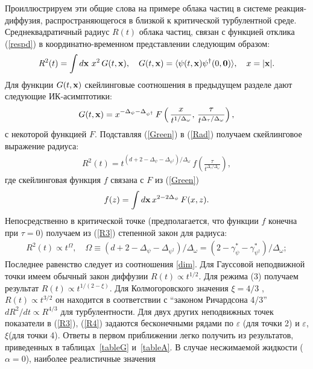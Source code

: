 \documentclass[a4paper,10pt]{article}
\begin{document}
Проиллюстрируем эти общие слова на примере облака частиц в системе реакция-диффузия, распространяющегося в близкой к критической турбулентной среде.
Среднеквадратичный радиус $R(t)$ облака частиц, связан с  функцией отклика (\ref{respd}) в координатно-временном представлении следующим образом:
\begin{eqnarray}
R^{2}(t) = \int d{\bf x}\ x^{2}\, G(t,{\bf x}), \quad
G(t,{\bf x}) = \langle \psi (t,{\bf x}) \psi^{\dag} (0,{\bf 0}) \rangle,
\quad x=|{\bf x}|.
\label{Rad}
\end{eqnarray}
Для  функции $G(t,{\bf x})$ скейлинговые соотношения в предыдущем разделе дают следующие ИК-асимптотики:
\begin{eqnarray}
G(t,{\bf x}) = x^{-\Delta_{\psi}-\Delta_{\psi^{\dag}}} \, F
\left(\, \frac{x} { t^ {1/\Delta_{\omega}} }, \,
\frac{\tau}{t^{\Delta_{\tau}/\Delta_{\omega}}}  \right),
\label{Green}
\end{eqnarray}
с некоторой функцией $F$.
Подставляя (\ref{Green}) в (\ref{Rad}) получаем скейлинговое выражение радиуса:
\begin{eqnarray}
R^2(t) = t^{ (d+2 -\Delta_{\psi}-\Delta_{\psi^{\dag}})/\Delta_{\omega} }
\, f \left( \frac{\tau}{t^{\Delta_{\tau}/\Delta_{\omega}}}  \right),
\label{R3}
\end{eqnarray}
где скейлинговая функция $f$  связана с $ F $ из (\ref{Green})
\[ f (z) = \int d{\bf x}\, x^{2-2\Delta_{\psi}} \, F(x,z). \]
Непосредственно в критической точке (предполагается, что функции  $f$  конечна при $\tau=0$) получаем из
(\ref{R3}) степенной закон для радиуса:
\begin{eqnarray}
R^2(t) \propto t^\Omega, \quad \Omega \equiv { (d+2
-\Delta_{\psi}-\Delta_{\psi^{\dag}})/ \Delta_{\omega} } =
{(2-\gamma_{\psi}^{*}-\gamma_{\psi^{\dag}}^{*})/\Delta_{\omega} };
\label{R4}
\end{eqnarray}
Последнее равенство следует из соотношения  \ref{dim}.
Для Гауссовой неподвижной точки имеем обычный закон диффузии  $R(t)\propto t^{1/2}$.
Для режима (3) получаем результат $R(t)\propto t^{1/(2-\xi)}$. Для Колмогоровского
значения $\xi=4/3$ , $R(t)\propto t^{3/2}$ он находится в соответствии с ``законом Ричардсона 4/3''
 $dR^{2}/dt \propto R^{4/3}$ для турбулентности.
Для двух других неподвижных точек показатели в (\ref{R3}), (\ref{R4}) задаются бесконечными рядами
по $\varepsilon$  (для точки 2) и  $\varepsilon$, $\xi$(для точки 4). Ответы в первом приближении легко получить из результатов, приведенных в таблицах~\ref{tableG} и~\ref{tableA}.
В случае несжимаемой жидкости  ($\alpha=0$), наиболее реалистичные значения
\end{document}
